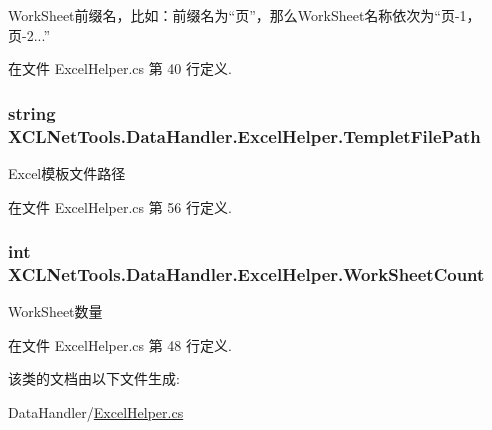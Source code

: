 Work\-Sheet前缀名，比如：前缀名为“页”，那么\-Work\-Sheet名称依次为“页-\/1，页-\/2...” 



在文件 Excel\-Helper.\-cs 第 40 行定义.

\hypertarget{class_x_c_l_net_tools_1_1_data_handler_1_1_excel_helper_a0e4501c60ef6446d0fe8151a6e58fca4}{
\subsubsection[{Templet\-File\-Path}]{\setlength{\rightskip}{0pt plus 5cm}string X\-C\-L\-Net\-Tools.\-Data\-Handler.\-Excel\-Helper.\-Templet\-File\-Path\hspace{0.3cm}{\ttfamily [set]}}}\label{class_x_c_l_net_tools_1_1_data_handler_1_1_excel_helper_a0e4501c60ef6446d0fe8151a6e58fca4}


Excel模板文件路径 



在文件 Excel\-Helper.\-cs 第 56 行定义.

\hypertarget{class_x_c_l_net_tools_1_1_data_handler_1_1_excel_helper_ab8d2677869ff64e25bbe54623ef9fa86}{
\subsubsection[{Work\-Sheet\-Count}]{\setlength{\rightskip}{0pt plus 5cm}int X\-C\-L\-Net\-Tools.\-Data\-Handler.\-Excel\-Helper.\-Work\-Sheet\-Count\hspace{0.3cm}{\ttfamily [get]}}}\label{class_x_c_l_net_tools_1_1_data_handler_1_1_excel_helper_ab8d2677869ff64e25bbe54623ef9fa86}


Work\-Sheet数量 



在文件 Excel\-Helper.\-cs 第 48 行定义.



该类的文档由以下文件生成\-:\begin{DoxyCompactItemize}
\item 
Data\-Handler/\hyperlink{_excel_helper_8cs}{Excel\-Helper.\-cs}\end{DoxyCompactItemize}
